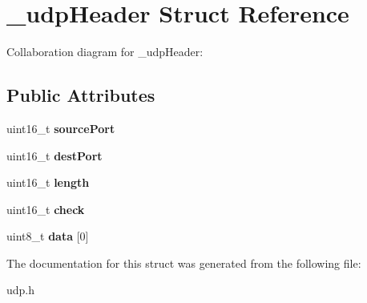 \hypertarget{struct__udpHeader}{}\section{\+\_\+udp\+Header Struct Reference}
\label{struct__udpHeader}


Collaboration diagram for \+\_\+udp\+Header\+:
\subsection*{Public Attributes}
\begin{DoxyCompactItemize}
\item 
\mbox{\label{struct__udpHeader_a318d6c6ebbb78b96e79451807b7187ec}} 
uint16\+\_\+t {\bfseries source\+Port}
\item 
\mbox{\label{struct__udpHeader_ad654bb71024cb9833c01f3a563ff5f65}} 
uint16\+\_\+t {\bfseries dest\+Port}
\item 
\mbox{\label{struct__udpHeader_a912e28858fbe7c6e92821bb7c0e8f93d}} 
uint16\+\_\+t {\bfseries length}
\item 
\mbox{\label{struct__udpHeader_a2f371a5a061e0167174a293c4ef427fd}} 
uint16\+\_\+t {\bfseries check}
\item 
\mbox{\label{struct__udpHeader_a1723bc19d441508c0cf4a9f506f37d68}} 
uint8\+\_\+t {\bfseries data} \mbox{[}0\mbox{]}
\end{DoxyCompactItemize}


The documentation for this struct was generated from the following file\+:\begin{DoxyCompactItemize}
\item 
udp.\+h\end{DoxyCompactItemize}
